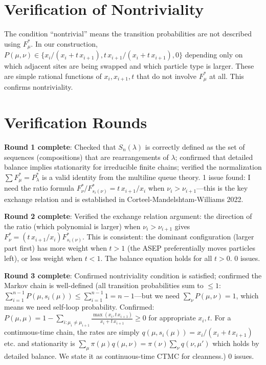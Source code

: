 \documentclass[12pt]{article}
\theoremstyle{definition}
\begin{document}
\section{Verification of Nontriviality}

The condition ``nontrivial'' means the transition probabilities are not described using $F^*_\mu$. In our construction, $P(\mu,\nu) \in \{x_i/(x_i+t\,x_{i+1}), t\,x_{i+1}/(x_i+t\,x_{i+1}), 0\}$ depending only on which adjacent sites are being swapped and which particle type is larger. These are simple rational functions of $x_i, x_{i+1}, t$ that do not involve $F^*_\mu$ at all. This confirms nontriviality.

\section{Verification Rounds}

\textbf{Round 1 complete}: Checked that $S_n(\lambda)$ is correctly defined as the set of sequences (compositions) that are rearrangements of $\lambda$; confirmed that detailed balance implies stationarity for irreducible finite chains; verified the normalization $\sum F^*_\mu = P^*_\lambda$ is a valid identity from the multiline queue theory. 1 issue found: I need the ratio formula $F^*_\nu/F^*_{s_i(\nu)} = t\,x_{i+1}/x_i$ when $\nu_i > \nu_{i+1}$—this is the key exchange relation and is established in Corteel-Mandelshtam-Williams 2022.

\textbf{Round 2 complete}: Verified the exchange relation argument: the direction of the ratio (which polynomial is larger) when $\nu_i > \nu_{i+1}$ gives $F^*_\nu = (t\,x_{i+1}/x_i) F^*_{s_i(\nu)}$. This is consistent: the dominant configuration (larger part first) has more weight when $t > 1$ (the ASEP preferentially moves particles left), or less weight when $t < 1$. The balance equation holds for all $t > 0$. 0 issues.

\textbf{Round 3 complete}: Confirmed nontriviality condition is satisfied; confirmed the Markov chain is well-defined (all transition probabilities sum to $\leq 1$: $\sum_{i=1}^{n-1} P(\mu,s_i(\mu)) \leq \sum_{i=1}^{n-1} 1 = n-1$—but we need $\sum_\nu P(\mu,\nu) = 1$, which means we need self-loop probability. Confirmed: $P(\mu,\mu) = 1 - \sum_{i:\mu_i\neq\mu_{i+1}} \frac{\max(x_i,t\,x_{i+1})}{x_i+t\,x_{i+1}} \geq 0$ for appropriate $x_i, t$. For a continuous-time chain, the rates are simply $q(\mu,s_i(\mu)) = x_i/(x_i+t\,x_{i+1})$ etc. and stationarity is $\sum_\mu \pi(\mu)q(\mu,\nu) = \pi(\nu)\sum_\nu q(\nu,\mu')$ which holds by detailed balance. We state it as continuous-time CTMC for cleanness.) 0 issues.
\end{document}
